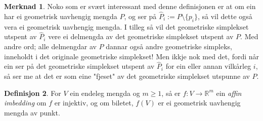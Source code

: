 \documentclass[a4paper, 12pt, norsk]{article}
\theoremstyle{plain}
\newtheorem{theorem}{Teorem}[section]
\theoremstyle{definition}
\newtheorem{definition}[theorem]{Definisjon}
\newtheorem{remark}[theorem]{Merknad}
\newcommand{\Rb}{\mathbb{R}}
\newcommand{\intersect}{ \mathop{\cap}\limits } %
\begin{document}
\begin{remark}
	Noko som er svært interessant med denne definisjonen er at om ein har ei geometrisk uavhengig mengda $P$, og ser på $\hat{P}_i := P \setminus \{p_i\}$, så vil dette også vera ei geometrisk uavhengig mengda. I tilleg så vil det geometriske simplekset utspent av $\hat{P}_i$ vere ei delmengda av det geometriske simplekset utspent av $P$. Med andre ord; alle delmengdar av $P$ dannar også andre geometriske simpleks, inneholdt i det originale geometriske simplekset! Men ikkje nok med det, fordi når ein ser på det geometriske simplekset utspent av $\hat{P}_i$ for ein eller annan vilkårleg $i$, så ser me at det er som eine "fjeset" av det geometriske simplekset utspunne av $P$. 
\end{remark}




\begin{definition}
	For $V$ ein endeleg mengda og $m\geq1$, så er $f:V\rightarrow \Rb^m$ ein \emph{affin imbedding} om $f$ er injektiv, og om biletet, $f(V)$ er ei geometrisk uavhengig mengda av punkt.
\end{definition}
\end{document}
